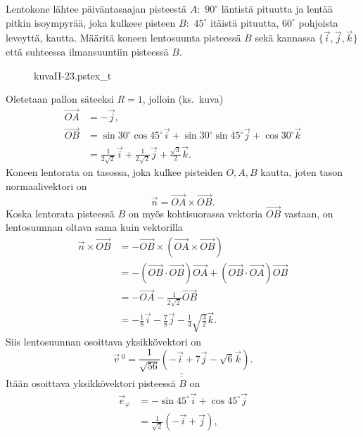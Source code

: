 \begin{Exa}
Lentokone lähtee päiväntasaajan pisteestä $A:$ $90^\circ$ läntistä pituutta ja lentää pitkin 
isoympyrää, joka kulkeee pisteen  $B:$ $45^\circ$ itäistä pituutta, $60^\circ$ pohjoista 
leveyttä, kautta. Määritä koneen lentosuunta pisteessä $B$ sekä kannassa 
$\{\vec i, \vec j, \vec k\}$ että suhteessa ilmansuuntiin pisteessä $B$.
\end{Exa}
\begin{figure}[H]
\begin{center}
{kuvaII-23.pstex_t}
\end{center}
\end{figure}
\ratk Oletetaan pallon säteeksi $R=1$, jolloin (ks.\ kuva)
\begin{align*}
\overrightarrow{OA} &= - \vec j, \\
\overrightarrow{OB} &= \sin{30^\circ}\cos{45^\circ} \vec i 
+ \sin{30^\circ}\sin{45^\circ} \vec j + \cos{30^\circ} \vec k \\
&= \frac{1}{2\sqrt{2}} \vec i + \frac{1}{2\sqrt{2}} \vec j +
\frac{\sqrt{3}}{2} \vec k.
\end{align*}
Koneen lentorata on tasossa, joka kulkee pisteiden $O, A, B$ kautta, joten tason normaalivektori
on
\[
\vec n = \overrightarrow{OA} \times \overrightarrow{OB}.
\]
Koska lentorata pisteessä $B$ on myös kohtisuorassa vektoria $\overrightarrow{OB}$ vastaan, on
lentosuunnan oltava sama kuin vektorilla
\begin{align*}
\vec n \times \overrightarrow{OB} &= - \overrightarrow{OB} 
                                       \times (\overrightarrow{OA} \times \overrightarrow{OB}) \\
&= -(\overrightarrow{OB} \cdot \overrightarrow{OB})\overrightarrow{OA} +
(\overrightarrow{OB} \cdot \overrightarrow{OA})\overrightarrow{OB} \\
&= -\overrightarrow{OA} - \frac{1}{2\sqrt{2}}\overrightarrow{OB} \\
&= -\frac{1}{8}\vec i - \frac{7}{8}\vec j - \frac{1}{4}\sqrt{\frac{3}{2}}\vec k.
\end{align*}
Siis lentosuunnan osoittava yksikkövektori on
\[
\underline{\underline{\vec v\,^0 = \frac{1}{\sqrt{56}}(-\vec i + 7\vec j -\sqrt{6}\vec k)}}.
\]
Itään osoittava yksikkövektori pisteessä $B$ on
\begin{align*}
\vec e_\varphi &= - \sin{45^\circ} \vec i + \cos{45^\circ} \vec j \\
&=\frac{1}{\sqrt{2}}(-\vec i + \vec j),
\end{align*}
